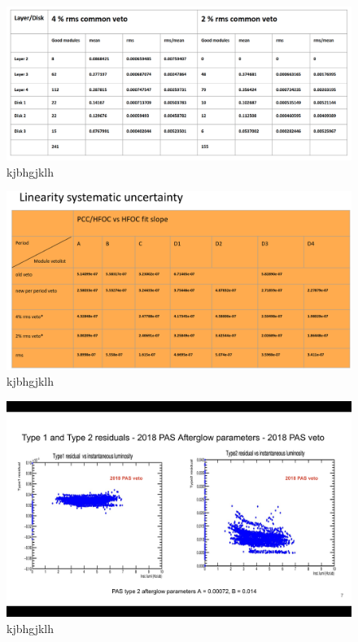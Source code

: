 \begin{figure}[!htp]
\centering
\includegraphics[width=1\textwidth]{ashish_thesis/pcc_layer_disk_mean_rms.png}
\caption{%
kjbhgjklh
}
\label{fig:linearitypcchfoc}
\end{figure}


\begin{figure}[!htp]
\centering
\includegraphics[width=1\textwidth]{ashish_thesis/lineairty_diff_veto_period_variation_slope.png}
\caption{%
kjbhgjklh
}
\label{fig:linearitypcchfoc}
\end{figure}


\begin{figure}[!htp]
\centering
\includegraphics[width=1\textwidth]{ashish_thesis/type1_type2_af_residuals_oldveto_oldp.png}
\caption{%
kjbhgjklh
}
\label{fig:linearitypcchfoc}
\end{figure}




